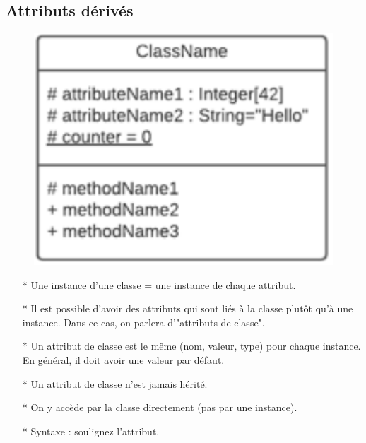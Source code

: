 \documentclass[12pt]{article}
\begin{document}
\subsection{Attributs dérivés}
\begin{figure}[!hbtp]
	\centering
	\includegraphics[scale=0.75]{Capture7.PNG}
\end{figure}
\begin{itemize}
	\item[* ] Une instance d'une classe = une instance de chaque
	attribut.
	\item[* ] Il est possible d'avoir des attributs qui sont liés
	à la classe plutôt qu'à une instance. Dans ce
	cas, on parlera d'"attributs de classe".
	\item[* ] Un attribut de classe est le même (nom, valeur,
	type) pour chaque instance. En général, il doit
	avoir une valeur par défaut.
	\item[* ] Un attribut de classe n'est jamais hérité.
	\item[* ] On y accède par la classe directement (pas par une
	instance).
	\item[* ] Syntaxe : soulignez l'attribut.
\end{itemize}
\end{document}
